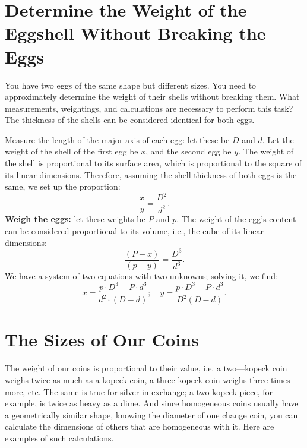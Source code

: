 \section[Weight of the Eggshell]{Determine the Weight of the Eggshell Without Breaking the Eggs}
\label{sec-11.9}


\ques You have two eggs of the same shape but different sizes. You need to approximately determine the weight of their shells without breaking them. What measurements, weightings, and calculations are necessary to perform this task? The thickness of the shells can be considered identical for both eggs.



\ans Measure the length of the major axis of each egg: let these be \( D \) and \( d \). Let the weight of the shell of the first egg be \( x \), and the second egg be \( y \). The weight of the shell is proportional to its surface area, which is proportional to the square of its linear dimensions. Therefore, assuming the shell thickness of both eggs is the same, we set up the proportion:
\begin{equation*}%
\frac{x}{y} = \frac{D^2}{d^2}.
\end{equation*}
\textbf{Weigh the eggs:} let these weights be \( P \) and \( p \). The weight of the egg's content can be considered proportional to its volume, i.e., the cube of its linear dimensions:
\begin{equation*}%
\frac{(P - x)}{(p - y)} = \frac{D^3}{d^3}.
\end{equation*}
We have a system of two equations with two unknowns; solving it, we find:
\begin{equation*}%
x = \frac{p \cdot D^3 - P \cdot d^3}{d^2 \cdot (D - d)}; \quad
y = \frac{p \cdot D^3 - P \cdot d^3}{D^2 (D - d)}.
\end{equation*}


\section{The Sizes of Our Coins}
\label{sec-11.10}

The weight of our coins is proportional to their value, i.e. a two—kopeck coin weighs twice as much as a kopeck coin, a three-kopeck coin weighs three times more, etc. The same is true for silver in exchange; a two-kopeck piece, for example, is twice as heavy as a dime. And since homogeneous coins usually have a geometrically similar shape, knowing the diameter of one change coin, you can calculate the dimensions of others that are homogeneous with it. Here are examples of such calculations.

